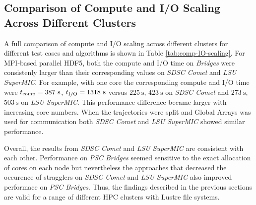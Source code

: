 \subsection{Comparison of Compute and I/O Scaling Across Different Clusters}
A full comparison of compute and I/O scaling across different clusters for different test cases and algorithms is shown in Table \ref{tab:comp-IO-scaling}. 
For MPI-based parallel HDF5, both the compute and I/O time on \emph{Bridges} were consistenly larger than their corresponding values on \emph{SDSC Comet} and \emph{LSU SuperMIC}.
For example, with one core the corresponding compute and I/O time were ${t}_{\text{comp}} = 387~\text{s}$, ${t}_{\text{I/O}} = 1318~\text{s}$ versus $225~\text{s}$, $423~\text{s}$ on \emph{SDSC Comet} and $273~\text{s}$, $503~\text{s}$ on \emph{LSU SuperMIC}.
This performance difference became larger with increasing core numbers.
When the trajectories were split and Global Arrays was used for communication both \emph{SDSC Comet} and \emph{LSU SuperMIC} showed similar performance.

Overall, the results from \emph{SDSC Comet} and \emph{LSU SuperMIC} are consistent with each other.
Performance on \emph{PSC Bridges} seemed sensitive to the exact allocation of cores on each node but nevertheless the approaches that decreased the occurence of stragglers on \emph{SDSC Comet} and \emph{LSU SuperMIC} also improved performace on \emph{PSC Bridges}.
Thus, the findings described in the previous sections are valid for a range of different HPC clusters with Lustre file systems.

